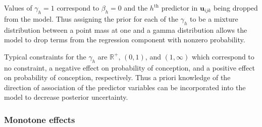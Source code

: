 \documentclass[11pt]{article}
\renewcommand{\vec}{\boldsymbol}
\begin{document}
\noindent Values of $\gamma_h = 1$ correspond to $\beta_h = 0$ and the $h^{\text{th}}$ predictor in $\vec{u}_{ijk}$ being dropped from the model.  Thus assigning the prior for each of the $\gamma_h$ to be a mixture distribution between a point mass at one and a gamma distribution allows the model to drop terms from the regression component with nonzero probability.

Typical constraints for the $\gamma_h$ are $\mathbb{R}^+,\, (0,1)$, and $(1,\infty)$ which correspond to no constraint, a negative effect on probability of conception, and a positive effect on probability of conception, respectively.  Thus a priori knowledge of the direction of association of the predictor variables can be incorporated into the model to decrease posterior uncertainty.

\subsubsection{Monotone effects}
\end{document}
